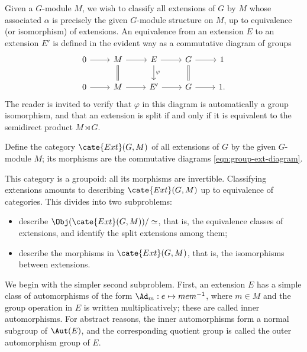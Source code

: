 Given a $G$-module $M$, we wish to classify all extensions of $G$ by $M$
whose associated $\alpha$ is precisely the given $G$-module structure on $M$,
up to equivalence (or isomorphism) of extensions. An equivalence from an
extension $E$ to an extension $E'$ is defined in the evident way as a
commutative diagram of groups
\begin{equation}\label{eqn:group-ext-diagram}\begin{tikzcd}
	0 \arrow[r] & M \arrow[r] \arrow[equal,d] &
	E \arrow[r] \arrow[d,"\varphi"] & G \arrow[r] \arrow[equal,d] & 1 \\
	0 \arrow[r] & M \arrow[r] & E' \arrow[r] & G \arrow[r] & 1.
\end{tikzcd}\end{equation}
The reader is invited to verify that $\varphi$ in this diagram is
automatically a group isomorphism, and that an extension is split if and only
if it is equivalent to the semidirect product $M\rtimes G$.

\begin{definition}
	Define the category $\cate{Ext}(G,M)$ of all extensions of $G$ by the
	given $G$-module $M$; its morphisms are the commutative diagrams
	\eqref{eqn:group-ext-diagram}.
\end{definition}

This category is a groupoid: all its morphisms are invertible. Classifying
extensions amounts to describing $\cate{Ext}(G,M)$ up to equivalence of
categories. This divides into two subproblems:
\begin{itemize}
	\item describe $\Obj(\cate{Ext}(G,M))/\simeq$, that is, the equivalence
	classes of extensions, and identify the split extensions among them;
	\item describe the morphisms in $\cate{Ext}(G,M)$, that is, the
	isomorphisms between extensions.
\end{itemize}
We begin with the simpler second subproblem. First, an extension $E$ has a
simple class of automorphisms of the form $\Ad_m:e\mapsto mem^{-1}$, where
$m\in M$ and the group operation in $E$ is written multiplicatively; these
are called inner automorphisms. For abstract reasons, the inner automorphisms
form a normal subgroup of $\Aut(E)$, and the corresponding quotient group is
called the outer automorphism group of $E$.

